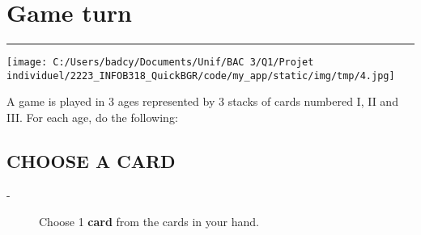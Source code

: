 \documentclass{scrartcl}%
\begin{document}
%
\section{ Game turn
}%
\label{sec:Gameturn}%
\rule{18cm}{0.07cm}\break%
%
\begin{center}\texttt{[image: C:/Users/badcy/Documents/Unif/BAC 3/Q1/Projet individuel/2223\_INFOB318\_QuickBGR/code/my\_app/static/img/tmp/4.jpg]}\end{center}%

%
A game is played in 3 ages represented by 3 stacks of cards numbered I, II and III. For each age, do the following:


%
\subsection{ CHOOSE A CARD
}%
\label{subsec:CHOOSEACARD}%
\begin{description}%
\item[{-} ]%
%
 Choose 1 %
\textbf{card}%
\textit{ }%
 from the cards in your hand.
%
\end{description}

%
\end{document}
